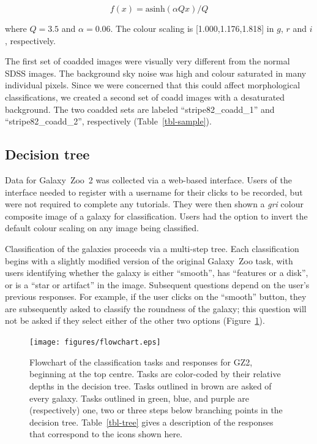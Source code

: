 \documentclass[useAMS,usenatbib]{mn2e}
\begin{document}
\begin{equation}
f(x)=\text{asinh}(\alpha Q x)/Q
\label{eqn-imagegen}
\end{equation}

\noindent where $Q=3.5$ and $\alpha=0.06$. The colour scaling is [1.000,1.176,1.818] in $g$, $r$ and $i$, respectively. 

The first set of coadded images were visually very different from the normal SDSS images. The background sky noise was high and colour saturated in many individual pixels. Since we were concerned that this could affect morphological classifications, we created a second set of coadd images with a desaturated background. The two coadded sets are labeled ``stripe82\_coadd\_1'' and ``stripe82\_coadd\_2'', respectively (Table~\ref{tbl-sample}). 

\subsection{Decision tree}\label{ssec-decision_tree}

Data for Galaxy~Zoo~2 was collected via a web-based interface. Users of the interface needed to register with a username for their clicks to be recorded, but were not required to complete any tutorials. They were then shown a {\it gri} colour composite image of a galaxy for classification. Users had the option to invert the default colour scaling on any image being classified. 

Classification of the galaxies proceeds via a multi-step tree. Each classification begins with a slightly modified version of the original Galaxy~Zoo task, with users identifying whether the galaxy is either ``smooth'', has ``features or a disk'', or is a ``star or artifact'' in the image. Subsequent questions depend on the user's previous responses. For example, if the user clicks on the ``smooth'' button, they are subsequently asked to classify the roundness of the galaxy; this question will not be asked if they select either of the other two options (Figure~\ref{fig-flowchart}). 

\begin{figure}
\texttt{[image: figures/flowchart.eps]}
\caption{Flowchart of the classification tasks and responses for GZ2, beginning at the top centre. Tasks are color-coded by their relative depths in the decision tree. Tasks outlined in brown are asked of every galaxy. Tasks outlined in green, blue, and purple are (respectively) one, two or three steps below branching points in the decision tree. Table~\ref{tbl-tree} gives a description of the responses that correspond to the icons shown here. 
\label{fig-flowchart}}
\end{figure}
\end{document}
